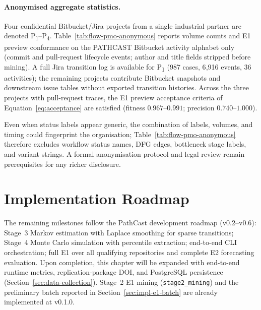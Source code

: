 \paragraph{Anonymised aggregate statistics.}
Four confidential Bitbucket/Jira projects from a single industrial partner are
denoted P\textsubscript{1}--P\textsubscript{4}. Table~\ref{tab:flow-pmo-anonymous}
reports volume counts and E1 preview conformance on the PATHCAST Bitbucket
activity alphabet only (commit and pull-request lifecycle events; author and
title fields stripped before mining). A full Jira transition log is available
for P\textsubscript{1} (987 cases, 6{,}916 events, 36 activities); the
remaining projects contribute Bitbucket snapshots and downstream issue tables
without exported transition histories. Across the three projects with pull-request
traces, the E1 preview acceptance criteria of Equation~\eqref{eq:acceptance}
are satisfied (fitness $0.967$--$0.991$; precision $0.740$--$1.000$).



Even when status labels appear generic, the combination of labels, volumes, and
timing could fingerprint the organisation; Table~\ref{tab:flow-pmo-anonymous}
therefore excludes workflow status names, DFG edges, bottleneck stage labels, and
variant strings. A formal anonymisation protocol and legal review remain
prerequisites for any richer disclosure.


\section{Implementation Roadmap}
\label{sec:impl-roadmap}

The remaining milestones follow the PathCast development roadmap (v0.2--v0.6):
Stage~3 Markov estimation with Laplace smoothing for sparse transitions;
Stage~4 Monte Carlo simulation with percentile extraction; end-to-end CLI
orchestration; full E1 over all qualifying repositories and complete E2
forecasting evaluation. Upon completion, this chapter will be expanded with
end-to-end runtime metrics, replication-package DOI, and PostgreSQL persistence
(Section~\ref{sec:data-collection}). Stage~2 E1 mining
(\texttt{stage2\_mining}) and the preliminary batch reported in
Section~\ref{sec:impl-e1-batch} are already implemented at v0.1.0.
